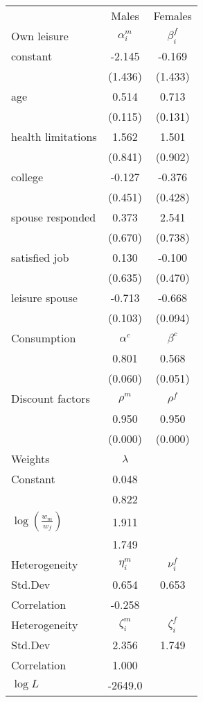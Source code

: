 \begin{tabular}{lcc} 
\hline\hline 
 & Males & Females \\ 
Own leisure & $\alpha_{i}^{m}$ & $\beta_{i}^{f}$ \\ 
constant & -2.145 & -0.169 \\ 
 & (1.436) & (1.433) \\ 
age & 0.514 & 0.713 \\ 
 & (0.115) & (0.131) \\ 
health limitations & 1.562 & 1.501 \\ 
 & (0.841) & (0.902) \\ 
college & -0.127 & -0.376 \\ 
 & (0.451) & (0.428) \\ 
spouse responded & 0.373 & 2.541 \\ 
 & (0.670) & (0.738) \\ 
satisfied job & 0.130 & -0.100 \\ 
 & (0.635) & (0.470) \\ 
leisure spouse & -0.713 & -0.668 \\ 
 & (0.103) & (0.094) \\ 
Consumption & $\alpha^{c}$ & $\beta^{c}$ \\ 
 & 0.801 & 0.568 \\ 
 & (0.060) & (0.051) \\ 
Discount factors & $\rho^m$ & $\rho^f$ \\ 
 & 0.950 & 0.950 \\ 
 & (0.000) & (0.000) \\ 
Weights & $\lambda$ &  \\ 
Constant & 0.048 &  \\ 
 & 0.822 &  \\ 
$\log(\frac{w_m}{w_f})$ & 1.911 &  \\ 
 & 1.749 &  \\ 
Heterogeneity & $\eta_i^m$ & $\nu_i^f$ \\ 
Std.Dev & 0.654 & 0.653 \\ 
Correlation & -0.258 &  \\ 
Heterogeneity & $\zeta_i^m$ & $\zeta_i^f$ \\ 
Std.Dev & 2.356 & 1.749 \\ 
Correlation & 1.000 &  \\ 
\hline 
$\log L$ & -2649.0 & \\ 
\hline \hline 
\end{tabular} 
